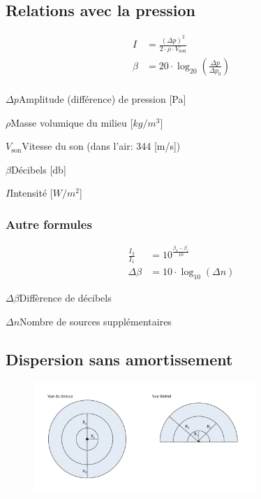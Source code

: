 \documentclass[12pt,a4paper]{article} %
\begin{document}
\subsection{Relations avec la pression}
\begin{twocols}
		\begin{align*}
		I &= \frac{(\Delta p)^2}{2 \cdot \rho \cdot V_\text{son}} \\
		\beta &= 20 \cdot \log_{20}\left(\frac{\Delta p}{\Delta p_0}\right) \\
	\end{align*}
\nextcol
	\begin{vardef}
		\item{$\Delta p$}{Amplitude (différence) de pression [Pa]}
		\item{$\rho$}{Masse volumique du milieu [$kg/m^3$]}
		\item{$V_\text{son}$}{Vitesse du son (dans l'air: 344 [m/s])}
		\item{$\beta$}{Décibels [db]}
		\item{$I$}{Intensité [$W/m^2$]}
	\end{vardef}
\end{twocols}

\subsubsection*{Autre formules}
\begin{twocols}
	\begin{align*}
		\frac{I_2}{I_1} &= 10^{\frac{\displaystyle \beta_2-\beta_1}{10}} \\
		\Delta\beta &= 10 \cdot \log_{10}(\Delta n)
	\end{align*}
\nextcol
	\begin{vardef}
		\item{$\Delta\beta$}{Diffèrence de décibels}
		\item{$\Delta n$}{Nombre de sources supplémentaires}
	\end{vardef}
\end{twocols}

\subsection{Dispersion sans amortissement}
\begin{figure}[h]
	\centering
	\includegraphics[width=0.75\textwidth]{Sonique-Dispersion}
\end{figure}
\end{document}
